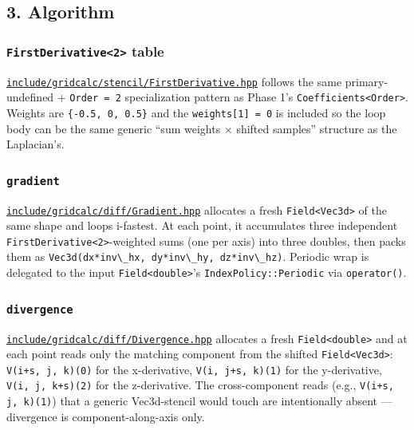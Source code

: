 \subsection{3. Algorithm}\label{algorithm}

\subsubsection{\texorpdfstring{\texttt{FirstDerivative\textless{}2\textgreater{}}
table}{FirstDerivative\textless2\textgreater{} table}}\label{firstderivative2-table}

\href{../../../include/gridcalc/stencil/FirstDerivative.hpp}{\passthrough{\lstinline!include/gridcalc/stencil/FirstDerivative.hpp!}}
follows the same primary-undefined + \passthrough{\lstinline!Order = 2!}
specialization pattern as Phase 1's
\passthrough{\lstinline!Coefficients<Order>!}. Weights are
\passthrough{\lstinline!\{-0.5, 0, 0.5\}!} and the
\passthrough{\lstinline!weights[1] = 0!} is included so the loop body
can be the same generic ``sum weights × shifted samples'' structure as
the Laplacian's.

\subsubsection{\texorpdfstring{\texttt{gradient}}{gradient}}\label{gradient}

\href{../../../include/gridcalc/diff/Gradient.hpp}{\passthrough{\lstinline!include/gridcalc/diff/Gradient.hpp!}}
allocates a fresh \passthrough{\lstinline!Field<Vec3d>!} of the same
shape and loops i-fastest. At each point, it accumulates three
independent \passthrough{\lstinline!FirstDerivative<2>!}-weighted sums
(one per axis) into three doubles, then packs them as
\passthrough{\lstinline!Vec3d(dx*inv\_hx, dy*inv\_hy, dz*inv\_hz)!}.
Periodic wrap is delegated to the input
\passthrough{\lstinline!Field<double>!}'s
\passthrough{\lstinline!IndexPolicy::Periodic!} via
\passthrough{\lstinline!operator()!}.

\subsubsection{\texorpdfstring{\texttt{divergence}}{divergence}}\label{divergence}

\href{../../../include/gridcalc/diff/Divergence.hpp}{\passthrough{\lstinline!include/gridcalc/diff/Divergence.hpp!}}
allocates a fresh \passthrough{\lstinline!Field<double>!} and at each
point reads only the matching component from the shifted
\passthrough{\lstinline!Field<Vec3d>!}:
\passthrough{\lstinline!V(i+s, j, k)(0)!} for the x-derivative,
\passthrough{\lstinline!V(i, j+s, k)(1)!} for the y-derivative,
\passthrough{\lstinline!V(i, j, k+s)(2)!} for the z-derivative. The
cross-component reads (e.g., \passthrough{\lstinline!V(i+s, j, k)(1)!})
that a generic Vec3d-stencil would touch are intentionally absent ---
divergence is component-along-axis only.

